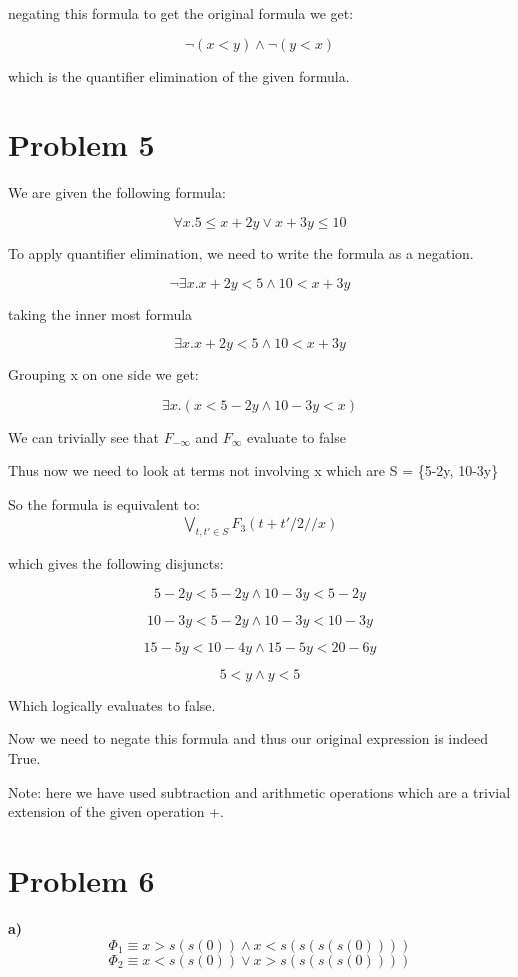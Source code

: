 \documentclass{article}
\begin{document}
negating this formula to get the original formula we get:

$$\neg (x < y) \land \neg (y < x)$$

which is the quantifier elimination of the given formula.

\section{Problem 5}

We are given the following formula:

$$\forall x. 5 \leq x + 2y \lor x + 3y \leq 10 $$

To apply quantifier elimination, we need to write the formula as a negation.

$$\neg \exists x. x+2y < 5 \land 10 < x+3y $$

taking the inner most formula

$$\exists x.  x+2y < 5 \land 10 < x+3y $$

Grouping x on one side we get:

$$\exists x. (x < 5 - 2y \land 10 -3y < x)$$

We can trivially see that $F_{-\infty}$ and $F_{\infty}$ evaluate to false

Thus now we need to look at terms not involving x which are S = \{5-2y, 10-3y\}

So the formula is equivalent to:
\begin{align*}
    \bigvee_{t,t' \in S} F_3(t+t'/2 // x)
\end{align*}

which gives the following disjuncts:

$$5-2y < 5-2y \land 10-3y < 5-2y$$

$$10-3y < 5-2y \land 10-3y < 10-3y$$

$$15 - 5y < 10-4y \land 15-5y < 20-6y$$

$$5 < y \land y < 5$$

Which logically evaluates to false.

Now we need to negate this formula and thus our original expression is indeed True.


\noindent Note: here we have used subtraction and arithmetic operations which are a trivial extension of the given operation +.

\section{Problem 6}
\noindent \textbf{a)} $$\Phi_1 \equiv x > s(s(0)) \land x < s(s(s(s(0))))$$
$$\Phi_2 \equiv x < s(s(0)) \lor x > s(s(s(s(0))))$$
\end{document}

